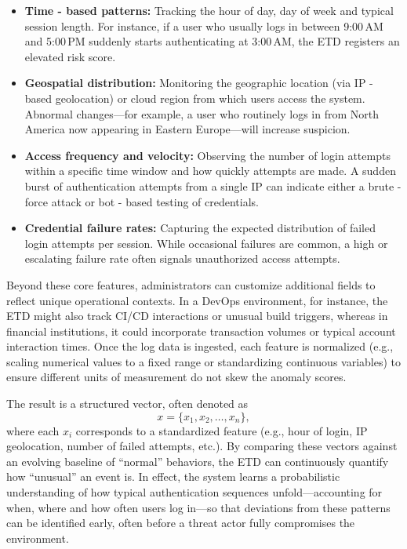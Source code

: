 \documentclass{article}
\begin{document}
\begin{itemize}
    \item \textbf{Time - based patterns:} 
    Tracking the hour of day, day of week and typical session length. For instance, if a user who usually logs in between 9:00\,AM and 5:00\,PM suddenly starts authenticating at 3:00\,AM, the ETD registers an elevated risk score.
    \item \textbf{Geospatial distribution:}
    Monitoring the geographic location (via IP - based geolocation) or cloud region from which users access the system. Abnormal changes—for example, a user who routinely logs in from North America now appearing in Eastern Europe—will increase suspicion.
    \item \textbf{Access frequency and velocity:}
    Observing the number of login attempts within a specific time window and how quickly attempts are made. A sudden burst of authentication attempts from a single IP can indicate either a brute - force attack or bot - based testing of credentials.
    \item \textbf{Credential failure rates:}
    Capturing the expected distribution of failed login attempts per session. While occasional failures are common, a high or escalating failure rate often signals unauthorized access attempts.
\end{itemize}

Beyond these core features, administrators can customize additional fields to reflect unique operational contexts. In a DevOps environment, for instance, the ETD might also track CI/CD interactions or unusual build triggers, whereas in financial institutions, it could incorporate transaction volumes or typical account interaction times. Once the log data is ingested, each feature is normalized (e.g., scaling numerical values to a fixed range or standardizing continuous variables) to ensure different units of measurement do not skew the anomaly scores.

The result is a structured vector, often denoted as
\[
  x = \{ x_1, x_2, \dots, x_n \},
\]
where each \(x_i\) corresponds to a standardized feature (e.g., hour of login, IP geolocation, number of failed attempts, etc.). By comparing these vectors against an evolving baseline of “normal” behaviors, the ETD can continuously quantify how “unusual” an event is. In effect, the system learns a probabilistic understanding of how typical authentication sequences unfold—accounting for when, where and how often users log in—so that deviations from these patterns can be identified early, often before a threat actor fully compromises the environment.
\end{document}

